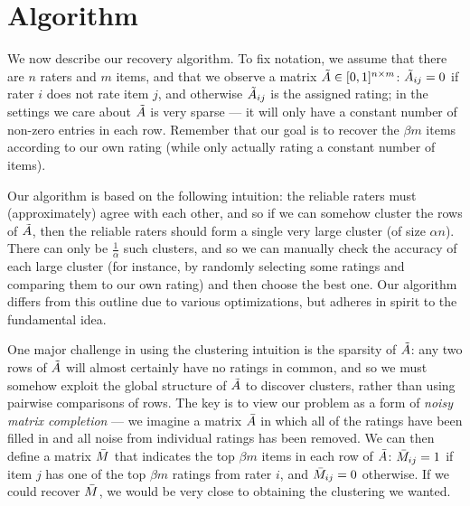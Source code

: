 \section{Algorithm}
\label{sec:algorithm}


We now describe our recovery algorithm. To fix notation, we assume that 
there are $n$ raters and $m$ items, and that we observe a matrix 
$\tilde{A} \in [0,1]^{n \times m}$: $\tilde{A}_{ij} = 0$ if rater $i$ does not rate item 
$j$, and otherwise $\tilde{A}_{ij}$ is the assigned rating; in the settings we 
care about $\tilde{A}$ is very sparse --- it will only have a constant number of 
non-zero entries in each row. Remember that our goal is to recover the 
$\beta m$ items according to our own rating (while only actually rating a 
constant number of items).

Our algorithm is based on the following intuition: the reliable raters must 
(approximately) agree with each other, and so if we can somehow cluster the 
rows of $\tilde{A}$, then the reliable raters should form a single very large cluster 
(of size $\alpha n$). There can only be $\frac{1}{\alpha}$ such clusters, and 
so we can manually check the accuracy of each large cluster (for instance, 
by randomly selecting some ratings and comparing them to our own rating) and 
then choose the best one.
Our algorithm differs from this outline due to various 
optimizations, but adheres in spirit to the fundamental idea. 



One major challenge in using the clustering intuition is the sparsity of 
$\tilde{A}$: any two rows of $\tilde{A}$ will almost certainly have no ratings in common, 
and so we must somehow exploit the global structure of $\tilde{A}$ to discover 
clusters, rather than using pairwise comparisons of rows.
The key is to view our problem as a form of \emph{noisy matrix completion} --- 
we imagine a matrix $\bar{A}$ in which all of the ratings have been filled in 
and all noise from individual ratings has been removed. We can then define a 
matrix $\bar{M}$ that indicates the top $\beta m$ items in each row of $\bar{A}$: 
$\bar{M}_{ij} = 1$ if item $j$ has one of the top $\beta m$ ratings from rater $i$, 
and $\bar{M}_{ij} = 0$ otherwise. If we could recover $\bar{M}$, we would be very 
close to obtaining the clustering we wanted.

